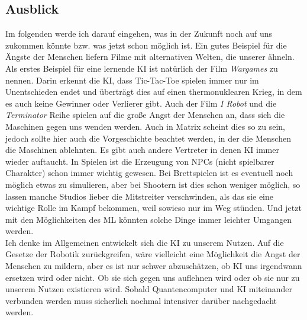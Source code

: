 \documentclass[12pt,a4paper,ngerman]{article}
\begin{document}
	\subsection{Ausblick}
	Im folgenden werde ich darauf eingehen, was in der Zukunft noch auf uns zukommen könnte bzw. was jetzt schon möglich ist. Ein gutes Beispiel für die Ängste der Menschen liefern Filme mit alternativen Welten, die unserer ähneln. Als erstes Beispiel für eine lernende KI ist natürlich der Film \textit{Wargames} zu nennen. Darin erkennt die KI, dass Tic-Tac-Toe spielen immer nur im Unentschieden endet und überträgt dies auf einen thermonuklearen Krieg, in dem es auch keine Gewinner oder Verlierer gibt. Auch der Film \textit{I Robot} und die \textit{Terminator} Reihe spielen auf die große Angst der Menschen an, dass sich die Maschinen gegen uns wenden werden. Auch in Matrix scheint dies so zu sein, jedoch sollte hier auch die Vorgeschichte beachtet werden, in der die Menschen die Maschinen ablehnten. Es gibt auch andere Vertreter in denen KI immer wieder auftaucht. In Spielen ist die Erzeugung von NPCs (nicht spielbarer Charakter) schon immer wichtig gewesen. Bei Brettspielen ist es eventuell noch möglich etwas zu simulieren, aber bei Shootern ist dies schon weniger möglich, so lassen manche Studios lieber die Mitstreiter verschwinden, als das sie eine wichtige Rolle im Kampf bekommen, weil sowieso nur im Weg stünden. Und jetzt mit den Möglichkeiten des ML könnten solche Dinge immer leichter Umgangen werden.\\
	Ich denke im Allgemeinen entwickelt sich die KI zu unserem Nutzen. Auf die Gesetze der Robotik zurückgreifen, wäre vielleicht eine Möglichkeit die Angst der Menschen zu mildern, aber es ist nur schwer abzuschätzen, ob KI uns irgendwann ersetzen wird oder nicht. Ob sie sich gegen uns auflehnen wird oder ob sie nur zu unserem Nutzen existieren wird. Sobald Quantencomputer und KI miteinander verbunden werden muss sicherlich nochmal intensiver darüber nachgedacht werden.
\end{document}
